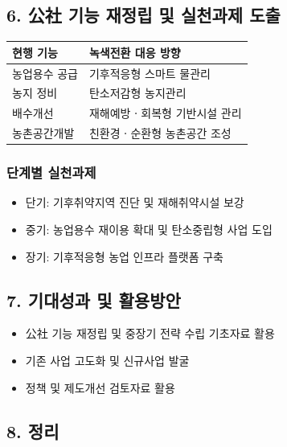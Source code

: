\subsection*{6. 公社 기능 재정립 및 실천과제 도출}

\begin{table}[h]
\centering
\renewcommand{\arraystretch}{1.3}
\begin{tabular}{p{5cm} p{9cm}}
\toprule
\rowcolor{gray!20}
현행 기능 & 녹색전환 대응 방향 \\
\midrule
농업용수 공급 & 기후적응형 스마트 물관리 \\
농지 정비 & 탄소저감형 농지관리 \\
배수개선 & 재해예방ㆍ회복형 기반시설 관리 \\
농촌공간개발 & 친환경ㆍ순환형 농촌공간 조성 \\
\bottomrule
\end{tabular}
\end{table}

\subsubsection*{단계별 실천과제}

\begin{itemize}
    \item 단기: 기후취약지역 진단 및 재해취약시설 보강
    \item 중기: 농업용수 재이용 확대 및 탄소중립형 사업 도입
    \item 장기: 기후적응형 농업 인프라 플랫폼 구축
\end{itemize}

\subsection*{7. 기대성과 및 활용방안}

\begin{itemize}
    \item 公社 기능 재정립 및 중장기 전략 수립 기초자료 활용
    \item 기존 사업 고도화 및 신규사업 발굴
    \item 정책 및 제도개선 검토자료 활용
\end{itemize}

\subsection*{8. 정리}

